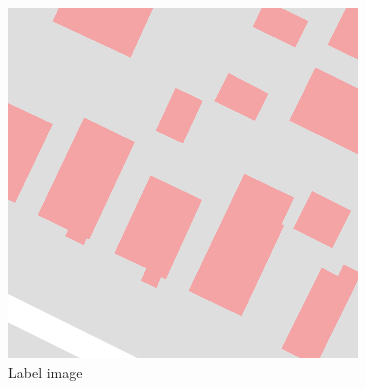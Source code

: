 \documentclass[]{IEEEtran}
\begin{document}
	\begin{figure}[!hbt]
	\vspace{-1cm}
		\begin{center}
		\includegraphics[width=\columnwidth]{LAB01-00000}
		\caption{Label image}
		\label{fig:label}
		\end{center}
	\end{figure}	


%
%
%
%
%
%

\end{document}
